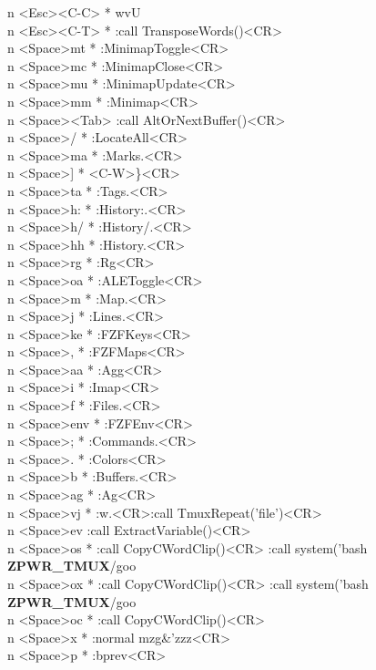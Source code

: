 \documentclass[11pt,a4paper,twoside]{book}
\begin{document}
n  <Esc><C-C>  * wvU\\
n  <Esc><C-T>  * :call TransposeWords()<CR>\\
n  <Space>mt  * :MinimapToggle<CR>\\
n  <Space>mc  * :MinimapClose<CR>\\
n  <Space>mu  * :MinimapUpdate<CR>\\
n  <Space>mm  * :Minimap<CR>\\
n  <Space><Tab>  :call AltOrNextBuffer()<CR>\\
n  <Space>/  * :LocateAll<CR>\\
n  <Space>ma  * :Marks.<CR>\\
n  <Space>]  * <C-W>\}<CR>\\
n  <Space>ta  * :Tags.<CR>\\
n  <Space>h:  * :History:.<CR>\\
n  <Space>h/  * :History/.<CR>\\
n  <Space>hh  * :History.<CR>\\
n  <Space>rg  * :Rg<CR>\\
n  <Space>oa  * :ALEToggle<CR>\\
n  <Space>m  * :Map.<CR>\\
n  <Space>j  * :Lines.<CR>\\
n  <Space>ke  * :FZFKeys<CR>\\
n  <Space>,  * :FZFMaps<CR>\\
n  <Space>aa  * :Agg<CR>\\
n  <Space>i  * :Imap<CR>\\
n  <Space>f  * :Files.<CR>\\
n  <Space>env  * :FZFEnv<CR>\\
n  <Space>;  * :Commands.<CR>\\
n  <Space>.  * :Colors<CR>\\
n  <Space>b  * :Buffers.<CR>\\
n  <Space>ag  * :Ag<CR>\\
n  <Space>vj  * :w.<CR>:call TmuxRepeat('file')<CR>\\
n  <Space>ev  :call ExtractVariable()<CR>\\
n  <Space>os  * :call CopyCWordClip()<CR> :call system('bash \textbf{ZPWR\_TMUX}/goo\\
n  <Space>ox  * :call CopyCWordClip()<CR> :call system('bash \textbf{ZPWR\_TMUX}/goo\\
n  <Space>oc  * :call CopyCWordClip()<CR>\\
n  <Space>x  * :normal mzg\&'zzz<CR>\\
n  <Space>p  * :bprev<CR>\\
\end{document}
